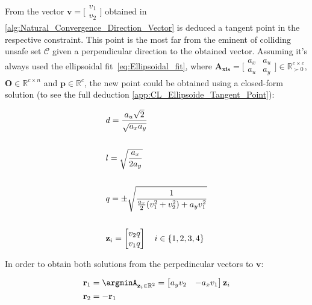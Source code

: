 From the vector \(\mathbf{v} = \bigl[\begin{smallmatrix} v_1\\ v_2 \end{smallmatrix} \bigr]\) obtained in \ref{alg:Natural_Convergence_Direction_Vector} is deduced a tangent point in the respective constraint. This point is the most far from the eminent of colliding unsafe set \(\mathcal{C}\) given a perpendicular direction to the obtained vector.%
 Assuming it's always used the ellipsoidal fit~\ref{eq:Ellipsoidal_fit}, where \(\mathbf{A_{xis}} = \bigl[\begin{smallmatrix} a_x&a_u \\ a_u&a_y \end{smallmatrix} \bigr] \in \mathbb{R}^{c \times c}_{\succ 0}\), \(\mathbf{O} \in \mathbb{R}^{c \times n}\) and \(\mathbf{p} \in \mathbb{R}^{c}\), the new point could be obtained using a closed-form solution (to see the full deduction \ref{app:CL_Ellipsoide_Tangent_Point}):


\begin{align}
    &d = \frac{a_u\sqrt{2}}{\sqrt{a_xa_y}} \label{eq:Constraint_Tangent_Point_auxElement1} \\
    \notag \\
    &l = \sqrt{\frac{a_x}{2a_y}} \label{eq:Constraint_Tangent_Point_auxElement2} \\
    \notag \\
    &q = \pm\sqrt{\frac{1}{\frac{a_x}{2}(v_1^2 + v_2^2) + a_yv_1^2}}  \label{eq:Constraint_Tangent_Point_auxAuxElement} \\
    \notag \\
    &\mathbf{z}_i = \begin{bmatrix}  v_2 q \\ v_1 q \end{bmatrix} \quad i \in \{1,2,3,4\} \label{eq:Constraint_Tangent_Point_auxVector} 
\end{align}

In order to obtain both solutions from the perpedincular vectors to \(\mathbf{v}\):

\begin{subequations}
    \begin{align}
        &\mathbf{r}_1 = \argminA_{\mathbf{z}_i \in \mathbb{R}^2} = \begin{bmatrix} a_yv_2 & - a_xv_1 \end{bmatrix} \mathbf{z}_{i} \label{eq:Constraint_Tangent_Point_bc_per} \\
        &\mathbf{r}_2 = -\mathbf{r}_1 \label{eq:Constraint_Tangent_Point_bc_perp_inverse}
    \end{align}
    \label{eq:Constraint_Tangent_Point_bc}
\end{subequations}   

